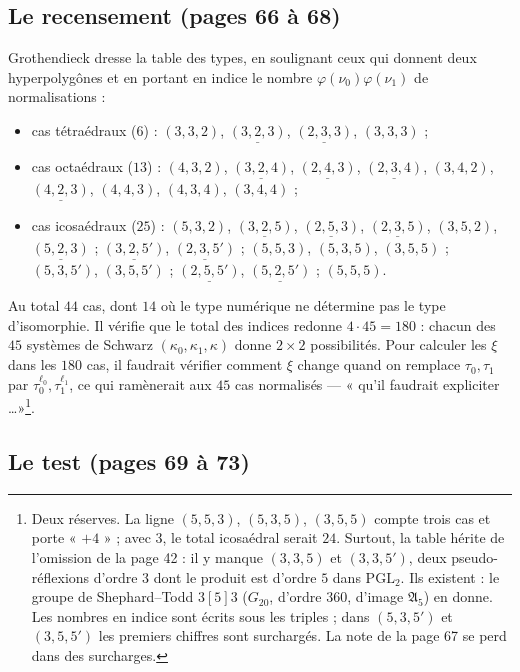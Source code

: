 \documentclass[11pt,a4paper]{article}
\begin{document}
\subsection*{Le recensement (pages 66 à 68)}

Grothendieck dresse la table des types, en soulignant ceux qui donnent deux
hyperpolygônes et en portant en indice le nombre $\varphi(\nu_0)\varphi(\nu_1)$
de normalisations :
\begin{itemize}
  \item cas tétraédraux ($6$) : $(3,3,2)$, $\underline{(3,2,3)}$,
    $\underline{(2,3,3)}$, $(3,3,3)$ ;
  \item cas octaédraux ($13$) : $(4,3,2)$, $\underline{(3,2,4)}$,
    $\underline{(2,4,3)}$, $\underline{(2,3,4)}$, $(3,4,2)$,
    $\underline{(4,2,3)}$, $(4,4,3)$, $(4,3,4)$, $(3,4,4)$ ;
  \item cas icosaédraux ($25$) : $(5,3,2)$, $\underline{(3,2,5)}$,
    $\underline{(2,5,3)}$, $\underline{(2,3,5)}$, $(3,5,2)$,
    $\underline{(5,2,3)}$ ; $\underline{(3,2,5')}$, $\underline{(2,3,5')}$ ;
    $(5,5,3)$, $(5,3,5)$, $(3,5,5)$ ; $(5,3,5')$, $(3,5,5')$ ;
    $\underline{(2,5,5')}$, $\underline{(5,2,5')}$ ; $(5,5,5)$.
\end{itemize}
Au total $44$ cas, dont $14$ où le type numérique ne détermine pas le type
d'isomorphie. Il vérifie que le total des indices redonne $4 \cdot 45 = 180$ :
chacun des $45$ systèmes de Schwarz $(\kappa_0, \kappa_1, \kappa)$ donne $2
\times 2$ possibilités. Pour calculer les $\xi$ dans les $180$ cas, il
faudrait vérifier comment $\xi$ change quand on remplace $\tau_0, \tau_1$ par
$\tau_0^{\ell_0}, \tau_1^{\ell_1}$, ce qui ramènerait aux $45$ cas normalisés
--- « qu'il faudrait expliciter \ldots »\footnote{Deux réserves. La ligne
$(5,5,3)$, $(5,3,5)$, $(3,5,5)$ compte trois cas et porte « $+4$ » ; avec $3$, le
total icosaédral serait $24$. Surtout, la table hérite de l'omission de la
page 42 : il y manque $(3,3,5)$ et $(3,3,5')$, deux pseudo-réflexions d'ordre
$3$ dont le produit est d'ordre $5$ dans $\mathrm{PGL}_2$. Ils existent : le
groupe de Shephard--Todd $3[5]3$ ($G_{20}$, d'ordre $360$, d'image
$\mathfrak{A}_5$) en donne. Les nombres en indice sont écrits sous les triples ;
dans $(5,3,5')$ et $(3,5,5')$ les premiers chiffres sont surchargés. La note de
la page 67 se perd dans des surcharges.}.

\subsection*{Le test (pages 69 à 73)}
\end{document}
